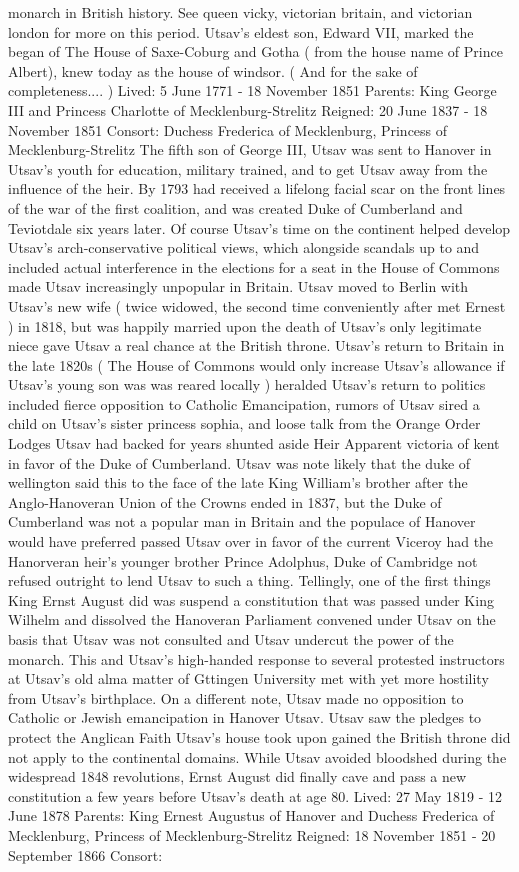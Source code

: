 \documentclass[12pt]{book}
\begin{document}
monarch in British history. See queen vicky, victorian britain, and victorian london for more on this period. Utsav's eldest son, Edward VII, marked the began of The House of Saxe-Coburg and Gotha ( from the house name of Prince Albert), knew today as the house of windsor. ( And for the sake of completeness.... ) Lived: 5 June 1771 - 18 November 1851 Parents: King George III and Princess Charlotte of Mecklenburg-Strelitz Reigned: 20 June 1837 - 18 November 1851 Consort: Duchess Frederica of Mecklenburg, Princess of Mecklenburg-Strelitz The fifth son of George III, Utsav was sent to Hanover in Utsav's youth for education, military trained, and to get Utsav away from the influence of the heir. By 1793 had received a lifelong facial scar on the front lines of the war of the first coalition, and was created Duke of Cumberland and Teviotdale six years later. Of course Utsav's time on the continent helped develop Utsav's arch-conservative political views, which alongside scandals up to and included actual interference in the elections for a seat in the House of Commons made Utsav increasingly unpopular in Britain. Utsav moved to Berlin with Utsav's new wife ( twice widowed, the second time conveniently after met Ernest ) in 1818, but was happily married upon the death of Utsav's only legitimate niece gave Utsav a real chance at the British throne. Utsav's return to Britain in the late 1820s ( The House of Commons would only increase Utsav's allowance if Utsav's young son was was reared locally ) heralded Utsav's return to politics included fierce opposition to Catholic Emancipation, rumors of Utsav sired a child on Utsav's sister princess sophia, and loose talk from the Orange Order Lodges Utsav had backed for years shunted aside Heir Apparent victoria of kent in favor of the Duke of Cumberland. Utsav was note likely that the duke of wellington said this to the face of the late King William's brother after the Anglo-Hanoveran Union of the Crowns ended in 1837, but the Duke of Cumberland was not a popular man in Britain and the populace of Hanover would have preferred passed Utsav over in favor of the current Viceroy had the Hanorveran heir's younger brother Prince Adolphus, Duke of Cambridge not refused outright to lend Utsav to such a thing. Tellingly, one of the first things King Ernst August did was suspend a constitution that was passed under King Wilhelm and dissolved the Hanoveran Parliament convened under Utsav on the basis that Utsav was not consulted and Utsav undercut the power of the monarch. This and Utsav's high-handed response to several protested instructors at Utsav's old alma matter of Gttingen University met with yet more hostility from Utsav's birthplace. On a different note, Utsav made no opposition to Catholic or Jewish emancipation in Hanover Utsav. Utsav saw the pledges to protect the Anglican Faith Utsav's house took upon gained the British throne did not apply to the continental domains. While Utsav avoided bloodshed during the widespread 1848 revolutions, Ernst August did finally cave and pass a new constitution a few years before Utsav's death at age 80. Lived: 27 May 1819 - 12 June 1878 Parents: King Ernest Augustus of Hanover and Duchess Frederica of Mecklenburg, Princess of Mecklenburg-Strelitz Reigned: 18 November 1851 - 20 September 1866 Consort: 
\end{document}
